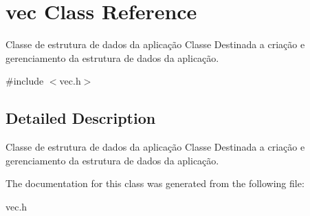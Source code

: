 \hypertarget{classvec}{\section{vec Class Reference}
\label{classvec}
}


Classe de estrutura de dados da aplicação Classe Destinada a criação e gerenciamento da estrutura de dados da aplicação.  




{\ttfamily \#include $<$vec.\-h$>$}



\subsection{Detailed Description}
Classe de estrutura de dados da aplicação Classe Destinada a criação e gerenciamento da estrutura de dados da aplicação. 

The documentation for this class was generated from the following file\-:\begin{DoxyCompactItemize}
\item 
vec.\-h\end{DoxyCompactItemize}
